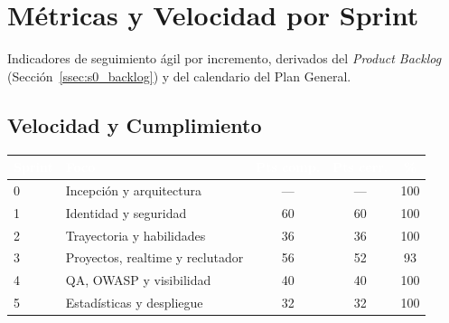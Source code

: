 \chapter{Métricas y Velocidad por Sprint}
\label{cap:anexo_metricas}

Indicadores de seguimiento ágil por incremento, derivados del \textit{Product Backlog}
(Sección~\ref{ssec:s0_backlog}) y del calendario del Plan General.\par

\section{Velocidad y Cumplimiento}
\label{sec:anexo_metricas_velocidad}
\renewcommand{\arraystretch}{1.3}
\fontsize{9}{10.8}\selectfont\sffamily
\noindent
\begin{tabularx}{\textwidth}{|l|X|c|c|c|}
\hline
\rowcolor{colorPrimario}
\textcolor{white}{\textbf{Sprint}} & \textcolor{white}{\textbf{Foco}} & \textcolor{white}{\textbf{Pts comp.}} & \textcolor{white}{\textbf{Pts cerr.}} & \textcolor{white}{\textbf{\%}} \\ \hline
0 & Incepción y arquitectura & --- & --- & 100 \\ \hline
\rowcolor{grisTecnico}
1 & Identidad y seguridad & 60 & 60 & 100 \\ \hline
2 & Trayectoria y habilidades & 36 & 36 & 100 \\ \hline
\rowcolor{grisTecnico}
3 & Proyectos, realtime y reclutador & 56 & 52 & 93 \\ \hline
4 & QA, OWASP y visibilidad & 40 & 40 & 100 \\ \hline
\rowcolor{grisTecnico}
5 & Estadísticas y despliegue & 32 & 32 & 100 \\ \hline
\end{tabularx}\normalfont\normalsize
\par\vspace{0.3cm}

